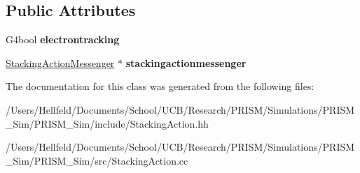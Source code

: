 \subsection*{Public Attributes}
\begin{DoxyCompactItemize}
\item 
\hypertarget{class_stacking_action_a5726770e0936fcae982b2576c7391135}{}\label{class_stacking_action_a5726770e0936fcae982b2576c7391135} 
G4bool {\bfseries electrontracking}
\item 
\hypertarget{class_stacking_action_afe6d3b915ea88fd4a19b9776155600a7}{}\label{class_stacking_action_afe6d3b915ea88fd4a19b9776155600a7} 
\hyperlink{class_stacking_action_messenger}{Stacking\+Action\+Messenger} $\ast$ {\bfseries stackingactionmessenger}
\end{DoxyCompactItemize}


The documentation for this class was generated from the following files\+:\begin{DoxyCompactItemize}
\item 
/\+Users/\+Hellfeld/\+Documents/\+School/\+U\+C\+B/\+Research/\+P\+R\+I\+S\+M/\+Simulations/\+P\+R\+I\+S\+M\+\_\+\+Sim/\+P\+R\+I\+S\+M\+\_\+\+Sim/include/Stacking\+Action.\+hh\item 
/\+Users/\+Hellfeld/\+Documents/\+School/\+U\+C\+B/\+Research/\+P\+R\+I\+S\+M/\+Simulations/\+P\+R\+I\+S\+M\+\_\+\+Sim/\+P\+R\+I\+S\+M\+\_\+\+Sim/src/Stacking\+Action.\+cc\end{DoxyCompactItemize}
